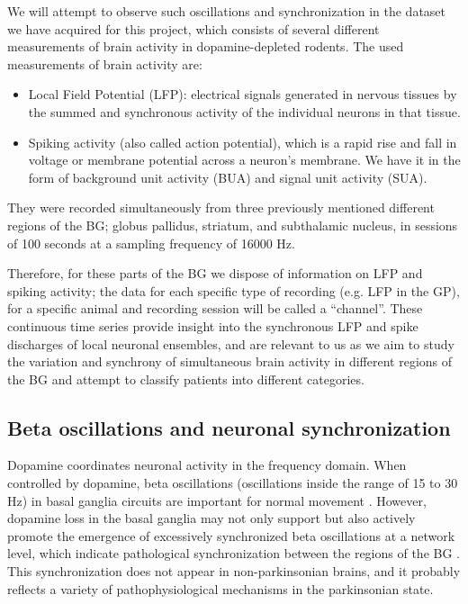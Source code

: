 \documentclass{article}
\begin{document}
We will attempt to observe such oscillations and synchronization in the dataset we have acquired for this project, which consists of several different measurements of brain activity in dopamine-depleted rodents. 
The used measurements of brain activity are:

\begin{itemize}
    \item Local Field Potential (LFP): electrical signals generated in nervous tissues by the summed and synchronous activity of the individual neurons in that tissue.
    \item Spiking activity (also called action potential), which is a rapid rise and fall in voltage or membrane potential across a neuron's membrane. We have it in the form of background unit activity (BUA) and signal unit activity (SUA).
\end{itemize}

They were recorded simultaneously from three previously mentioned different regions of the BG; globus pallidus, striatum, and subthalamic nucleus, in sessions of 100 seconds at a sampling frequency of 16000 Hz.

Therefore, for these parts of the BG we dispose of information on LFP and spiking activity; the data for each specific type of recording (e.g. LFP in the GP), for a specific animal and recording session will be called a “channel”. 
These continuous time series provide insight into the synchronous LFP and spike discharges of local neuronal ensembles, and are relevant to us as we aim to study the variation and synchrony of simultaneous brain activity in different regions of the BG and attempt to classify patients into different categories.

\subsection{Beta oscillations and neuronal synchronization}\label{BG BetaOsc NeurSyn}

Dopamine coordinates neuronal activity in the frequency domain. 
When controlled by dopamine, beta oscillations (oscillations inside the range of 15 to 30 Hz) in basal ganglia circuits are important for normal movement \citep{Cagnan}. 
However, dopamine loss in the basal ganglia may not only support but also actively promote the emergence of excessively synchronized beta oscillations at a network level, which indicate pathological synchronization between the regions of the BG \citep{Hammond}. 
This synchronization does not appear in non-parkinsonian brains, and it probably reflects a variety of pathophysiological mechanisms in the parkinsonian state.
\end{document}
